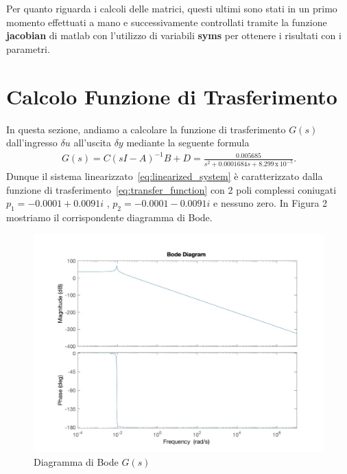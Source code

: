 \documentclass[a4paper, 11pt]{article}
\begin{document}
Per quanto riguarda i calcoli delle matrici, questi ultimi sono stati in un primo momento effettuati a mano e successivamente controllati tramite la funzione \textbf{jacobian} di matlab con l'utilizzo di variabili \textbf{syms} per ottenere i risultati con i parametri.

\section{Calcolo Funzione di Trasferimento}

In questa sezione, andiamo a calcolare la funzione di trasferimento $G(s)$ dall'ingresso $\delta u$ all'uscita $\delta y$ mediante la seguente formula 
%
%
\begin{align}\label{eq:transfer_function}
G(s) = C (sI-A)^{-1} B + D = \frac{0.005685}{s^2 + 0.0001684 s + 8.299 \,\mbox{x}\, 10^{-5}}.
\end{align}
%
Dunque il sistema linearizzato~\eqref{eq:linearized_system} è caratterizzato dalla funzione di trasferimento~\eqref{eq:transfer_function} con 2 poli complessi coniugati $p_1 =  -0.0001 + 0.0091 i$ , $p_2 =  -0.0001 - 0.0091 i$ e nessuno zero. In Figura 2 mostriamo il corrispondente diagramma di Bode. 

\begin{figure} [htp]
    \centering
    \includegraphics[scale = 0.28]{Immagini/Bode_GG.jpg}
    \caption{Diagramma di Bode $G(s)$}
    \label{fig:enter-label}
\end{figure}

\vspace{10 cm}
\end{document}
